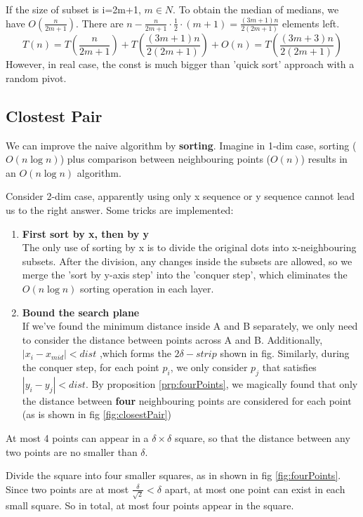 If the size of subset is i=2m+1, $m \in N$. To obtain the median of medians, we have $O(\frac{n}{2m+1})$. There are $n-\frac{n}{2m+1} \cdot \frac{1}{2}\cdot (m+1) = \frac{(3m+1)n}{2(2m+1)}$ elements left.
\[
    T(n)=T(\frac{n}{2m+1})+T(\frac{(3m+1)n}{2(2m+1)})+O(n)=T(\frac{(3m+3)n}{2(2m+1)})\]
However, in real case, the const is much bigger than 'quick sort' approach with a random pivot.


\subsection{Clostest Pair}
We can improve the naive algorithm by \textbf{sorting}. Imagine in 1-dim case, sorting ($O(n\log n)$) plus comparison between neighbouring points ($O(n)$) results in an $O(n \log n)$ algorithm.

Consider 2-dim case, apparently using only x sequence or y sequence cannot lead us to the right answer. Some tricks are implemented:
\begin{enumerate}
    \item \textbf{First sort by x, then by y}\\
    The only use of sorting by x is to divide the original dots into x-neighbouring subsets. After the division, any changes inside the subsets are allowed, so we merge the 'sort by y-axis step' into the 'conquer step', which eliminates the $O(n\log n)$ sorting operation in each layer.
    \item \textbf{Bound the search plane}\\
    If we've found the minimum distance inside A and B separately, we only need to consider the distance between points across A and B. Additionally, $|x_i-x_{mid}|<dist$ ,which forms the $2\delta-strip$ shown in fig. 
    Similarly, during the conquer step, for each point $p_i$, we only consider $p_j$ that satisfies $|y_i-y_j|<dist$.
    By proposition \ref*{prp:fourPoints}, we magically found that only the distance between \textbf{four} neighbouring points are considered for each point (as is shown in fig \ref*{fig:closestPair})

\end{enumerate}
\begin{prp}
    At most 4 points can appear in a $\delta \times \delta$ square, so that the distance between any two points are no smaller than $\delta$.
    \label{prp:fourPoints}
\end{prp}
\begin{prf}
    Divide the square into four smaller squares, as in shown in fig \ref*{fig:fourPoints}. Since two points are at most $\frac{\delta}{\sqrt{2}}<\delta$ apart, at most one point can exist in each small square. So in total, at most four points appear in the square.
\end{prf}
